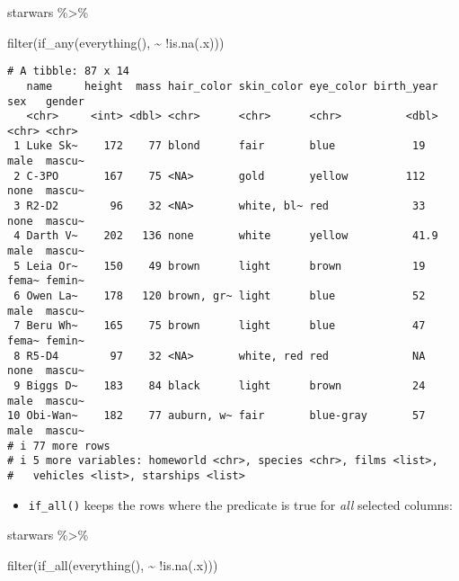 \documentclass[
  letterpaper,
  DIV=11,
  numbers=noendperiod]{scrreprt}
\newenvironment{Shaded}{\begin{snugshade}}{\end{snugshade}}
\newcommand{\FunctionTok}[1]{\textcolor[rgb]{0.28,0.35,0.67}{#1}}
\newcommand{\NormalTok}[1]{\textcolor[rgb]{0.00,0.23,0.31}{#1}}
\newcommand{\SpecialCharTok}[1]{\textcolor[rgb]{0.37,0.37,0.37}{#1}}
\providecommand{\tightlist}{%
  \setlength{\itemsep}{0pt}\setlength{\parskip}{0pt}}\usepackage{longtable,booktabs,array}
\begin{document}
\begin{Shaded}
\begin{Highlighting}[]
\NormalTok{starwars }\SpecialCharTok{\%\textgreater{}\%}

\FunctionTok{filter}\NormalTok{(}\FunctionTok{if\_any}\NormalTok{(}\FunctionTok{everything}\NormalTok{(), }\SpecialCharTok{\textasciitilde{}} \SpecialCharTok{!}\FunctionTok{is.na}\NormalTok{(.x)))}
\end{Highlighting}
\end{Shaded}

\begin{verbatim}
# A tibble: 87 x 14
   name     height  mass hair_color skin_color eye_color birth_year sex   gender
   <chr>     <int> <dbl> <chr>      <chr>      <chr>          <dbl> <chr> <chr> 
 1 Luke Sk~    172    77 blond      fair       blue            19   male  mascu~
 2 C-3PO       167    75 <NA>       gold       yellow         112   none  mascu~
 3 R2-D2        96    32 <NA>       white, bl~ red             33   none  mascu~
 4 Darth V~    202   136 none       white      yellow          41.9 male  mascu~
 5 Leia Or~    150    49 brown      light      brown           19   fema~ femin~
 6 Owen La~    178   120 brown, gr~ light      blue            52   male  mascu~
 7 Beru Wh~    165    75 brown      light      blue            47   fema~ femin~
 8 R5-D4        97    32 <NA>       white, red red             NA   none  mascu~
 9 Biggs D~    183    84 black      light      brown           24   male  mascu~
10 Obi-Wan~    182    77 auburn, w~ fair       blue-gray       57   male  mascu~
# i 77 more rows
# i 5 more variables: homeworld <chr>, species <chr>, films <list>,
#   vehicles <list>, starships <list>
\end{verbatim}

\begin{itemize}
\tightlist
\item
  \texttt{if\_all()} keeps the rows where the predicate is true for
  \emph{all} selected columns:
\end{itemize}

\begin{Shaded}
\begin{Highlighting}[]
\NormalTok{starwars }\SpecialCharTok{\%\textgreater{}\%}

\FunctionTok{filter}\NormalTok{(}\FunctionTok{if\_all}\NormalTok{(}\FunctionTok{everything}\NormalTok{(), }\SpecialCharTok{\textasciitilde{}} \SpecialCharTok{!}\FunctionTok{is.na}\NormalTok{(.x)))}
\end{Highlighting}
\end{Shaded}
\end{document}
